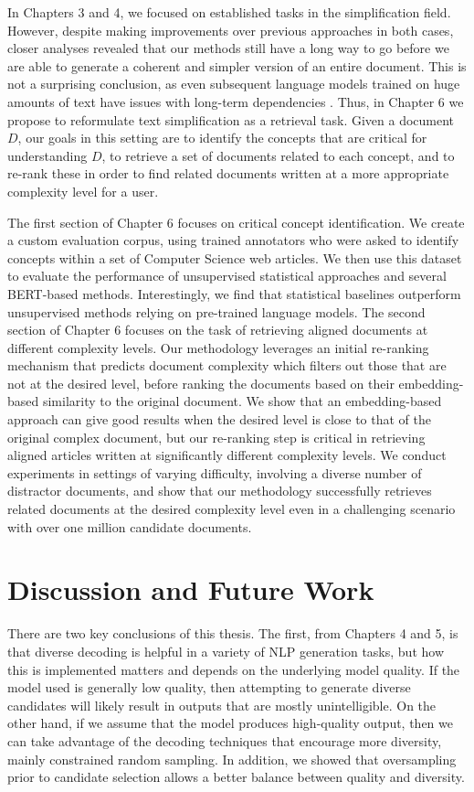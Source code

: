 \documentclass[thesis.tex]{subfiles}
\begin{document}
In Chapters 3 and 4, we focused on established tasks in the simplification field. However, despite making improvements over previous approaches in both cases, closer analyses revealed that our methods still have a long way to go before we are able to generate a coherent and simpler version of an entire document. This is not a surprising conclusion, as even subsequent language models trained on huge amounts of text have issues with long-term dependencies \citep{ippolito2020automatic}. Thus, in Chapter 6 we propose to reformulate text simplification as a retrieval task. Given a document $D$, our goals in this setting are to identify the concepts that are critical for understanding $D$, to retrieve a set of documents related to each concept, and to re-rank these in order to find related documents written at a more appropriate complexity level for a user.

The first section of Chapter 6 focuses on critical concept identification. We create a custom evaluation corpus, using trained annotators who were asked to identify concepts within a set of Computer Science web articles. We then use this dataset to evaluate the performance of unsupervised statistical approaches and several BERT-based methods. Interestingly, we find that statistical baselines outperform unsupervised methods relying on pre-trained language models. The second section of Chapter 6 focuses on the task of retrieving aligned documents at different complexity levels. Our methodology leverages an initial re-ranking mechanism that predicts document complexity which filters out those that are not at the desired level, before ranking the documents based on their embedding-based similarity to the original document. We show that an embedding-based approach can give good results when the desired level is close to that of the original complex document, but our re-ranking step is critical in retrieving aligned articles written at significantly different complexity levels. We conduct experiments in settings of varying difficulty, involving a diverse number of distractor documents, and show that our methodology successfully retrieves related documents at the desired complexity level even in a challenging scenario with over one million candidate documents.

\section{Discussion and Future Work}

There are two key conclusions of this thesis. The first, from Chapters 4 and 5, is that diverse decoding is helpful in a variety of NLP generation tasks, but how this is implemented matters and depends on the underlying model quality. If the model used is generally low quality, then attempting to generate diverse candidates will likely result in outputs that are mostly unintelligible. On the other hand, if we assume that the model produces high-quality output, then we can take advantage of the decoding techniques that encourage more diversity, mainly constrained random sampling. In addition, we showed that oversampling prior to candidate selection allows a better balance between quality and diversity. 
\end{document}
